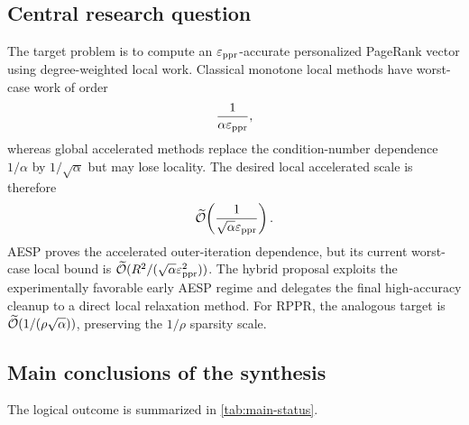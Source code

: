 \subsection{Central research question}

The target problem is to compute an \(\varepsilon_{\mathrm{ppr}}\)-accurate personalized PageRank
vector using degree-weighted local work.  Classical monotone local methods
have worst-case work of order
\[
    \frac{1}{\alpha\varepsilon_{\mathrm{ppr}}},
\]
whereas global accelerated methods replace the condition-number dependence
\(1/\alpha\) by \(1/\sqrt{\alpha}\) but may lose locality.  The desired local
accelerated scale is therefore
\begin{equation}
    \widetilde{\mathcal O}\!\left(\frac{1}{\sqrt{\alpha}\varepsilon_{\mathrm{ppr}}}\right).
    \label{eq:target-complexity}
\end{equation}
AESP proves the accelerated outer-iteration dependence, but its current
worst-case local bound is
\(
\widetilde{\mathcal O}(R^2/(\sqrt{\alpha}\varepsilon_{\mathrm{ppr}}^2))
\).
The hybrid proposal exploits the experimentally favorable early AESP regime
and delegates the final high-accuracy cleanup to a direct local relaxation
method.  For RPPR, the analogous target is
\(\widetilde{\mathcal O}(1/(\rho\sqrt\alpha))\), preserving the \(1/\rho\) sparsity scale.

\subsection{Main conclusions of the synthesis}

The logical outcome is summarized in \cref{tab:main-status}.

